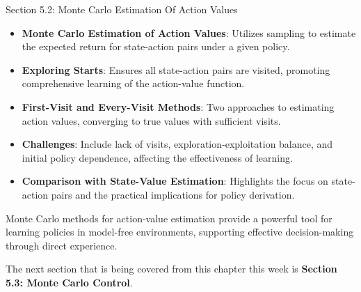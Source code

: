 \begin{notes}{Section 5.2: Monte Carlo Estimation Of Action Values}
\begin{highlight}
        \begin{itemize}
            \item \textbf{Monte Carlo Estimation of Action Values}: Utilizes sampling to estimate the expected return for state-action pairs under a given policy.
            \item \textbf{Exploring Starts}: Ensures all state-action pairs are visited, promoting comprehensive learning of the action-value function.
            \item \textbf{First-Visit and Every-Visit Methods}: Two approaches to estimating action values, converging to true values with sufficient visits.
            \item \textbf{Challenges}: Include lack of visits, exploration-exploitation balance, and initial policy dependence, affecting the effectiveness of learning.
            \item \textbf{Comparison with State-Value Estimation}: Highlights the focus on state-action pairs and the practical implications for policy derivation.
        \end{itemize}
    
        Monte Carlo methods for action-value estimation provide a powerful tool for learning policies in model-free environments, supporting effective decision-making through direct experience.
    
    \end{highlight}
\end{notes}

The next section that is being covered from this chapter this week is \textbf{Section 5.3: Monte Carlo Control}.

